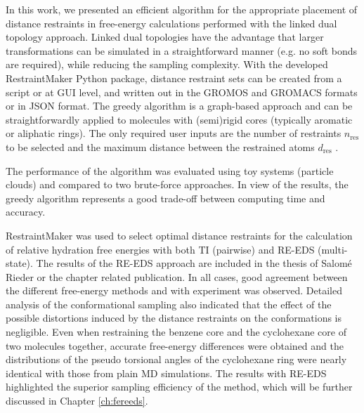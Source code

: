 In this work, we presented an efficient algorithm for the appropriate placement of distance restraints in free-energy calculations performed with the linked dual topology approach. Linked dual topologies have the advantage that larger transformations can be simulated in a straightforward manner (e.g. no soft bonds are required), while reducing the sampling complexity. 
With the developed RestraintMaker Python package, distance restraint sets can be created from a script or at GUI level, and written out in the GROMOS and GROMACS formats or in JSON format.
The greedy algorithm is a graph-based approach and can be straightforwardly applied to molecules with (semi)rigid cores (typically aromatic or aliphatic rings). The only required user inputs are the number of restraints $n_\text{res}$ to be selected and the maximum distance between the restrained atoms $d_\text{res}$ .

The performance of the algorithm was evaluated using toy systems (particle clouds) and compared to two brute-force approaches. In view of the results, the greedy algorithm represents a good trade-off between computing time and accuracy.

RestraintMaker was used to select optimal distance restraints for the calculation of relative hydration free energies with both TI (pairwise) and RE-EDS (multi-state). The results of the RE-EDS approach are included in the thesis of Salom\'e Rieder or the chapter related publication. In all cases, good agreement between the different free-energy methods and with experiment was observed. Detailed analysis of the conformational sampling also indicated that the effect of the possible distortions induced by the distance restraints on the conformations is negligible. Even when restraining the benzene core and the cyclohexane core of two molecules together, accurate free-energy differences were obtained and the distributions of the pseudo torsional angles of the cyclohexane ring were nearly identical with those from plain MD simulations.
The results with RE-EDS highlighted the superior sampling efficiency of the method, which will be further discussed in Chapter \ref{ch:fereeds}.